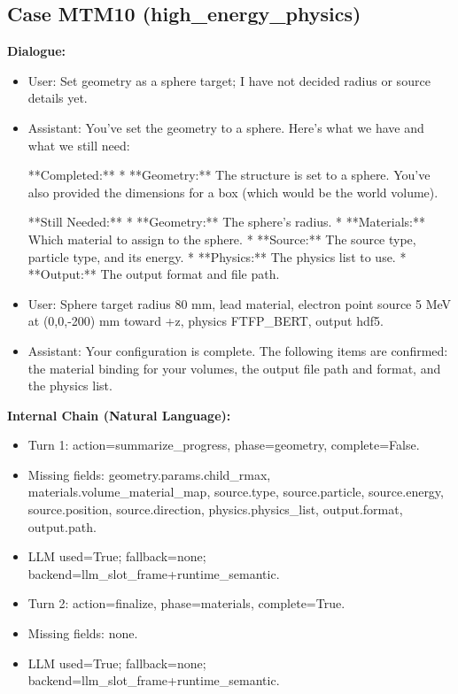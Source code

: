 \documentclass[11pt]{ctexart}
\begin{document}
\subsection{Case MTM10 (high\_energy\_physics)}
\textbf{Dialogue:}
\begin{itemize}
\item User: Set geometry as a sphere target; I have not decided radius or source details yet.
\item Assistant: You've set the geometry to a sphere. Here's what we have and what we still need:

**Completed:**
*   **Geometry:** The structure is set to a sphere. You've also provided the dimensions for a box (which would be the world volume).

**Still Needed:**
*   **Geometry:** The sphere's radius.
*   **Materials:** Which material to assign to the sphere.
*   **Source:** The source type, particle type, and its energy.
*   **Physics:** The physics list to use.
*   **Output:** The output format and file path.
\item User: Sphere target radius 80 mm, lead material, electron point source 5 MeV at (0,0,-200) mm toward +z, physics FTFP\_BERT, output hdf5.
\item Assistant: Your configuration is complete. The following items are confirmed: the material binding for your volumes, the output file path and format, and the physics list.
\end{itemize}
\textbf{Internal Chain (Natural Language):}
\begin{itemize}
\item Turn 1: action=summarize\_progress, phase=geometry, complete=False.
\item Missing fields: geometry.params.child\_rmax, materials.volume\_material\_map, source.type, source.particle, source.energy, source.position, source.direction, physics.physics\_list, output.format, output.path.
\item LLM used=True; fallback=none; backend=llm\_slot\_frame+runtime\_semantic.
\item Turn 2: action=finalize, phase=materials, complete=True.
\item Missing fields: none.
\item LLM used=True; fallback=none; backend=llm\_slot\_frame+runtime\_semantic.
\end{itemize}
\end{document}
